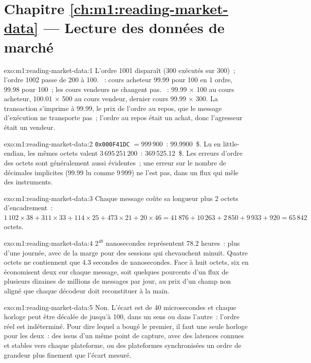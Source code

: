 \section*{Chapitre \ref{ch:m1:reading-market-data} --- Lecture des données de marché}

\begin{solution}{exo:m1:reading-market-data:1}
L'ordre 1001 disparaît (300 exécutés sur 300)~; l'ordre 1002 passe de 200 à 100.
~: cours acheteur 99.99 pour 100 en 1 ordre, 99.98 pour 100~; les cours vendeurs ne changent pas. ~: 99.99 $\times$ 100 au cours acheteur, 100.01 $\times$ 500 au cours vendeur, dernier cours 99.99 $\times$ 300. La
transaction s'imprime à 99.99, le prix de l'ordre au repos, que le message d'exécution
ne transporte pas~; l'ordre au repos était un achat, donc l'agresseur était un
vendeur.
\end{solution}

\begin{solution}{exo:m1:reading-market-data:2}
\texttt{0x000F41DC} $= 999\,900$~: 99.9900~\$. Lu en little-endian, les mêmes octets
valent $3\,695\,251\,200$~: 369\,525.12~\$. Les erreurs d'ordre des octets sont généralement aussi
évidentes~; une erreur sur le nombre de décimales implicites (99.99 lu comme 9\,999) ne
l'est pas, dans un flux qui mêle des instruments.
\end{solution}

\begin{solution}{exo:m1:reading-market-data:3}
Chaque message coûte sa longueur plus 2 octets d'encadrement~: $1\,102 \times 38 + 311
\times 33 + 114 \times 25 + 473 \times 21 + 20 \times 46 = 41\,876 + 10\,263 + 2\,850 +
9\,933 + 920 = 65\,842$ octets.
\end{solution}

\begin{solution}{exo:m1:reading-market-data:4}
$2^{48}$ nanosecondes représentent 78.2 heures~: plus d'une journée, avec de la marge pour des sessions
qui chevauchent minuit. Quatre octets ne contiennent que 4.3 secondes de nanosecondes. Face à
huit octets, six en économisent deux sur chaque message, soit quelques pourcents d'un flux de
plusieurs dizaines de millions de messages par jour, au prix d'un champ non aligné que
chaque décodeur doit reconstituer à la main.
\end{solution}

\begin{solution}{exo:m1:reading-market-data:5}
Non. L'écart est de 40 microsecondes et chaque horloge peut être décalée de jusqu'à 100,
dans un sens ou dans l'autre~: l'ordre réel est indéterminé. Pour dire lequel a bougé
le premier, il faut une seule horloge pour les deux~: des  issus d'un même point
de capture, avec des latences connues et stables vers chaque plateforme, ou des plateformes synchronisées
un ordre de grandeur plus finement que l'écart mesuré.
\end{solution}

